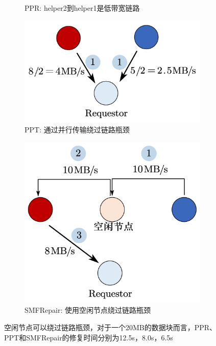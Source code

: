 \begin{figure}[tb!]
\begin{subfigure}[t]{0.4\textwidth}
            \caption{PPR: helper2到helper1是低带宽链路}
            \label{fig:2.3-2}
    \end{subfigure}
    \begin{subfigure}[t]{0.4\textwidth}
            \centering
            \includegraphics[scale=0.3]{figures/2.3-3.pdf}
            \caption{PPT: 通过并行传输绕过链路瓶颈}
            \label{fig:2.3-3}
    \end{subfigure}
    \begin{subfigure}[t]{0.4\textwidth}
            \centering
            \includegraphics[scale=0.3]{figures/2.3-4.pdf}
            \caption{SMFRepair: 使用空闲节点绕过链路瓶颈}
            \label{fig:2.3-4}
    \end{subfigure}
    \caption{空闲节点可以绕过链路瓶颈，对于一个20MB的数据块而言，PPR、PPT和SMFRepair的修复时间分别为12.5s，8.0s，6.5s}
	\label{fig:2.3}
\end{figure}
